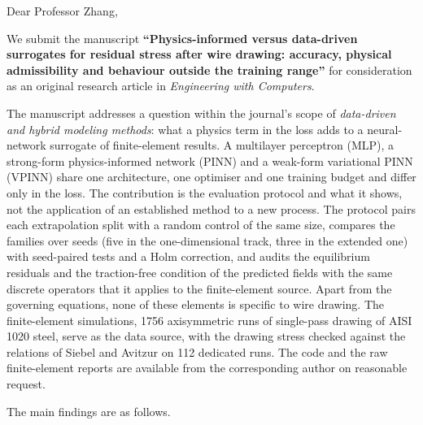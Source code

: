 \documentclass[11pt,a4paper]{article}
\begin{document}
\raggedright
Dear Professor Zhang,

We submit the manuscript \textbf{``Physics-informed versus data-driven surrogates for residual stress after wire drawing: accuracy, physical admissibility and behaviour outside the training range''} for consideration as an original research article in \emph{Engineering with Computers}.

The manuscript addresses a question within the journal's scope of \emph{data-driven and hybrid modeling methods}: what a physics term in the loss adds to a neural-network surrogate of finite-element results. A multilayer perceptron (MLP), a strong-form physics-informed network (PINN) and a weak-form variational PINN (VPINN) share one architecture, one optimiser and one training budget and differ only in the loss. The contribution is the evaluation protocol and what it shows, not the application of an established method to a new process. The protocol pairs each extrapolation split with a random control of the same size, compares the families over seeds (five in the one-dimensional track, three in the extended one) with seed-paired tests and a Holm correction, and audits the equilibrium residuals and the traction-free condition of the predicted fields with the same discrete operators that it applies to the finite-element source. Apart from the governing equations, none of these elements is specific to wire drawing. The finite-element simulations, 1756 axisymmetric runs of single-pass drawing of AISI 1020 steel, serve as the data source, with the drawing stress checked against the relations of Siebel and Avitzur on 112 dedicated runs. The code and the raw finite-element reports are available from the corresponding author on reasonable request.

The main findings are as follows.
\end{document}
